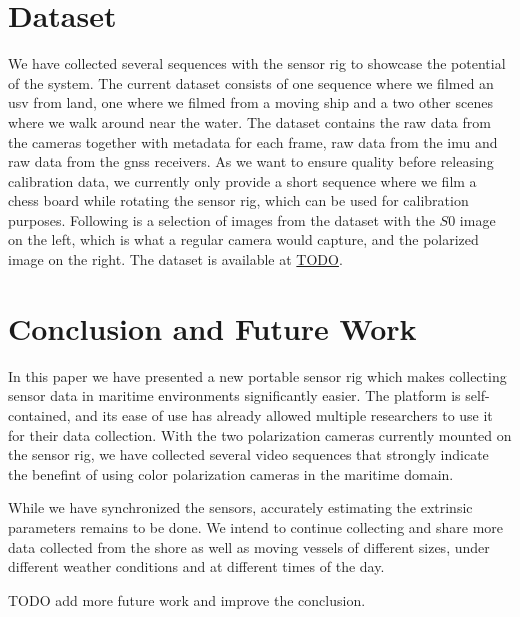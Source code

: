 

\section{Dataset}
We have collected several sequences with the sensor rig to showcase the potential of the system.
The current dataset consists of one sequence where we filmed an \gls{usv} from land, one where we filmed from a moving ship and a two other scenes where we walk around near the water.
The dataset contains the raw data from the cameras together with metadata for each frame, raw data from the \gls{imu} and raw data from the \gls{gnss} receivers.
As we want to ensure quality before releasing calibration data, we currently only provide a short sequence where we film a chess board while rotating the sensor rig, which can be used for calibration purposes.
Following is a selection of images from the dataset with the $S0$ image on the left, which is what a regular camera would capture, and the polarized image on the right.
The dataset is available at \url{TODO}.

\section{Conclusion and Future Work}
In this paper we have presented a new portable sensor rig which makes collecting sensor data in maritime environments significantly easier.
The platform is self-contained, and its ease of use has already allowed multiple researchers to use it for their data collection.
With the two polarization cameras currently mounted on the sensor rig, we have collected several video sequences that strongly indicate the benefint of using color polarization cameras in the maritime domain.

While we have synchronized the sensors, accurately estimating the extrinsic parameters remains to be done.
We intend to continue collecting and share more data collected from the shore as well as moving vessels of different sizes, under different weather conditions and at different times of the day.

TODO add more future work and improve the conclusion.



